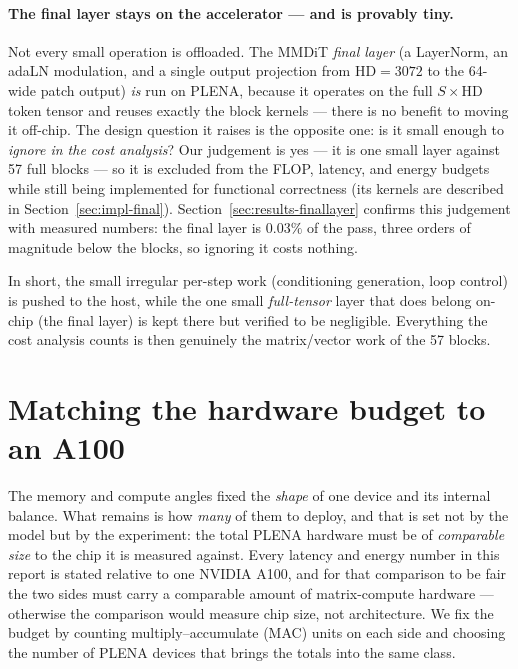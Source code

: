 \documentclass[11pt]{report}
\begin{document}
\paragraph{The final layer stays on the accelerator --- and is provably
tiny.} Not every small operation is offloaded. The MMDiT \emph{final layer}
(a LayerNorm, an adaLN modulation, and a single output projection from
$\text{HD}=3072$ to the 64-wide patch output) \emph{is} run on PLENA, because
it operates on the full $S\times\text{HD}$ token tensor and reuses exactly the
block kernels --- there is no benefit to moving it off-chip. The design
question it raises is the opposite one: is it small enough to \emph{ignore in
the cost analysis}? Our judgement is yes --- it is one small layer against 57
full blocks --- so it is excluded from the FLOP, latency, and energy budgets
while still being implemented for functional correctness (its kernels are
described in Section~\ref{sec:impl-final}). Section~\ref{sec:results-finallayer}
confirms this judgement with measured numbers: the final layer is
\textbf{$0.03\%$} of the pass, three orders of magnitude below the blocks, so
ignoring it costs nothing.

In short, the small irregular per-step work (conditioning generation, loop
control) is pushed to the host, while the one small \emph{full-tensor} layer
that does belong on-chip (the final layer) is kept there but verified to be
negligible. Everything the cost analysis counts is then genuinely the
matrix/vector work of the 57 blocks.

\section{Matching the hardware budget to an A100}
\label{sec:a100-match}

The memory and compute angles fixed the \emph{shape} of one device and its
internal balance. What remains is how \emph{many} of them to deploy, and
that is set not by the model but by the experiment: the total PLENA hardware
must be of \emph{comparable size} to the chip it is measured against. Every
latency and energy number in this report is stated relative to one NVIDIA
A100, and for that comparison to be fair the two sides must carry a
comparable amount of matrix-compute hardware --- otherwise the comparison
would measure chip size, not architecture. We fix the budget by counting
multiply--accumulate (MAC) units on each side and choosing the number of
PLENA devices that brings the totals into the same class.
\end{document}

